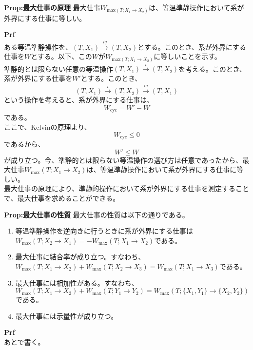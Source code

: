 \documentclass[a4paper,11pt]{jsarticle}
\begin{document}
\begin{itembox}[l]{\textbf{Prop:最大仕事の原理}}
    最大仕事$W_{\text{max}(T;X_1\rightarrow X_2)}$は、等温準静操作において系が外界にする仕事に等しい。
\end{itembox}
\textbf{Prf}\\
ある等温準静操作を、$(T,X_1) \xrightarrow{iq} (T,X_2)$とする。このとき、系が外界にする仕事を$W$とする。以下、この$W$が$W_{\text{max}(T;X_1\rightarrow X_2)}$に等しいことを示す。\\
準静的とは限らない任意の等温操作$(T,X_1) \xrightarrow{i} (T,X_2)$を考える。このとき、系が外界にする仕事を$W'$とする。このとき、
\begin{equation}
    (T,X_1) \xrightarrow{i} (T,X_2) \xrightarrow{iq} (T,X_1)
\end{equation}
という操作を考えると、系が外界にする仕事は、
\begin{equation}
    W_{\text{cyc}} = W'-W
\end{equation}
である。\\
ここで、Kelvinの原理より、
\begin{equation}
    W_{\text{cyc}} \leq 0
\end{equation}
であるから、
\begin{equation}
    W' \leq W
\end{equation}
が成り立つ。今、準静的とは限らない等温操作の選び方は任意であったから、最大仕事$W_{\text{max}}(T;X_1\rightarrow X_2)$は、等温準静操作において系が外界にする仕事に等しい。\\

最大仕事の原理により、準静的操作において系が外界にする仕事を測定することで、最大仕事を求めることができる。\\

\begin{itembox}[l]{\textbf{Prop:最大仕事の性質}}
    最大仕事の性質は以下の通りである。
    \begin{enumerate}
        \item 等温準静操作を逆向きに行うときに系が外界にする仕事は$W_{\text{max}}(T;X_2\rightarrow X_1)=-W_{\text{max}}(T;X_1\rightarrow X_2)$である。
        \item 最大仕事に結合率が成り立つ。すなわち、$W_{\text{max}}(T;X_1\rightarrow X_2)+W_{\text{max}}(T;X_2\rightarrow X_3) = W_{\text{max}}(T;X_1\rightarrow X_3)$である。
        \item 最大仕事には相加性がある。すなわち、$W_{\text{max}}(T;X_1\rightarrow X_2)+W_{\text{max}}(T;Y_1\rightarrow Y_2) = W_{\text{max}}(T;\{X_1,Y_1\}\rightarrow \{X_2,Y_2\})$である。
        \item 最大仕事には示量性が成り立つ。
    \end{enumerate}
\end{itembox}
\textbf{Prf}\\
あとで書く。\\
\end{document}
